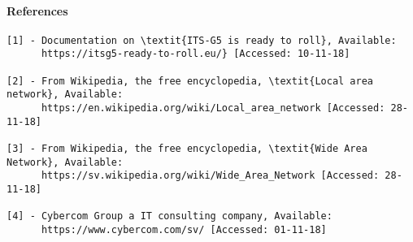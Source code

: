 \paragraph{References}
\begin{verbatim}
[1] - Documentation on \textit{ITS-G5 is ready to roll}, Available:
      https://itsg5-ready-to-roll.eu/} [Accessed: 10-11-18] 

[2] - From Wikipedia, the free encyclopedia, \textit{Local area network}, Available: 
      https://en.wikipedia.org/wiki/Local_area_network [Accessed: 28-11-18] 

[3] - From Wikipedia, the free encyclopedia, \textit{Wide Area Network}, Available: 
      https://sv.wikipedia.org/wiki/Wide_Area_Network [Accessed: 28-11-18] 

[4] - Cybercom Group a IT consulting company, Available:
      https://www.cybercom.com/sv/ [Accessed: 01-11-18]
\end{verbatim}